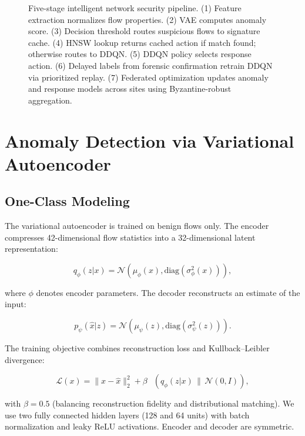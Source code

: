 \documentclass[preprint,12pt]{elsarticle}
\DeclareMathOperator{\KL}{D_{\mathrm{KL}}}
\begin{document}
\begin{figure}[!t]
\caption{Five-stage intelligent network security pipeline. (1) Feature extraction normalizes flow properties. (2) VAE computes anomaly score. (3) Decision threshold routes suspicious flows to signature cache. (4) HNSW lookup returns cached action if match found; otherwise routes to DDQN. (5) DDQN policy selects response action. (6) Delayed labels from forensic confirmation retrain DDQN via prioritized replay. (7) Federated optimization updates anomaly and response models across sites using Byzantine-robust aggregation.}
\label{fig:pipeline}
\end{figure}

\section{Anomaly Detection via Variational Autoencoder}
\label{sec:anomaly}

\subsection{One-Class Modeling}

The variational autoencoder is trained on benign flows only. The encoder compresses 42-dimensional flow statistics into a 32-dimensional latent representation:

\[
q_\phi(z|x) = \mathcal{N}(\mu_\phi(x), \text{diag}(\sigma_\phi^2(x))),
\]

where $\phi$ denotes encoder parameters. The decoder reconstructs an estimate of the input:

\[
p_\psi(\hat{x}|z) = \mathcal{N}(\mu_\psi(z), \text{diag}(\sigma_\psi^2(z))).
\]

The training objective combines reconstruction loss and Kullback--Leibler divergence:

\begin{equation}
\mathcal{L}(x) = \|\!x - \hat{x}\!\|_2^2 + \beta \, \KL\!\left(q_\phi(z|x) \,\|\, \mathcal{N}(0, I)\right),
\label{eq:vae_loss}
\end{equation}

with $\beta = 0.5$ (balancing reconstruction fidelity and distributional matching). We use two fully connected hidden layers (128 and 64 units) with batch normalization and leaky ReLU activations. Encoder and decoder are symmetric.
\end{document}
